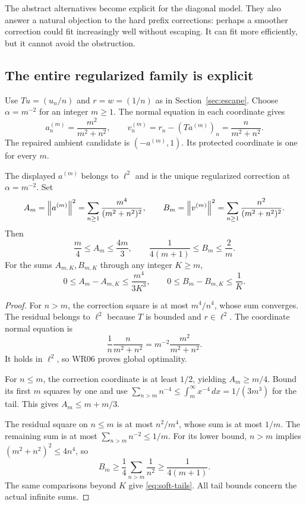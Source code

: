 \label{sec:diagonal-regularization}
The abstract alternatives become explicit for the diagonal model. They also answer a natural objection to the hard prefix corrections: perhaps a smoother correction could fit increasingly well without escaping. It can fit more efficiently, but it cannot avoid the obstruction.

\subsection{The entire regularized family is explicit}
Use $Tu=(u_n/n)$ and $r=w=(1/n)$ as in Section~\ref{sec:escape}. Choose $\alpha=m^{-2}$ for an integer $m\ge1$. The normal equation in each coordinate gives
\[
 a^{(m)}_n=\frac{m^2}{m^2+n^2},\qquad
 v^{(m)}_n=r_n-(Ta^{(m)})_n=\frac{n}{m^2+n^2}.
\]
The repaired ambient candidate is $(-a^{(m)},1)$. Its protected coordinate is one for every $m$.

\begin{proposition}\label{WR10}
The displayed $a^{(m)}$ belongs to $\ell^2$ and is the unique regularized correction at $\alpha=m^{-2}$. Set
\[
 A_m=\left\lVert a^{(m)}\right\rVert^2=\sum_{n\ge1}\frac{m^4}{(m^2+n^2)^2},\qquad
 B_m=\left\lVert v^{(m)}\right\rVert^2=\sum_{n\ge1}\frac{n^2}{(m^2+n^2)^2}.
\]
Then
\begin{equation}\label{eq:soft-bounds}
 \frac m4\le A_m\le\frac{4m}{3},\qquad
 \frac1{4(m+1)}\le B_m\le\frac2m.
\end{equation}
For the sums $A_{m,K},B_{m,K}$ through any integer $K\ge m$,
\begin{equation}\label{eq:soft-tails}
 0\le A_m-A_{m,K}\le\frac{m^4}{3K^3},\qquad
 0\le B_m-B_{m,K}\le\frac1K.
\end{equation}
\end{proposition}
\begin{proof}
For $n>m$, the correction square is at most $m^4/n^4$, whose sum converges. The residual belongs to $\ell^2$ because $T$ is bounded and $r\in\ell^2$. The coordinate normal equation is
\[
 \frac1n\frac{n}{m^2+n^2}=m^{-2}\frac{m^2}{m^2+n^2}.
\]
It holds in $\ell^2$, so WR06 proves global optimality.

For $n\le m$, the correction coordinate is at least $1/2$, yielding $A_m\ge m/4$. Bound its first $m$ squares by one and use
$\sum_{n>m}n^{-4}\le\int_m^\infty x^{-4}\,dx=1/(3m^3)$ for the tail. This gives $A_m\le m+m/3$.

The residual square on $n\le m$ is at most $n^2/m^4$, whose sum is at most $1/m$. The remaining sum is at most $\sum_{n>m}n^{-2}\le1/m$. For its lower bound, $n>m$ implies $(m^2+n^2)^2\le4n^4$, so
\[
 B_m\ge\frac14\sum_{n>m}\frac1{n^2}\ge\frac1{4(m+1)}.
\]
The same comparisons beyond $K$ give \eqref{eq:soft-tails}. All tail bounds concern the actual infinite sums.
\end{proof}

